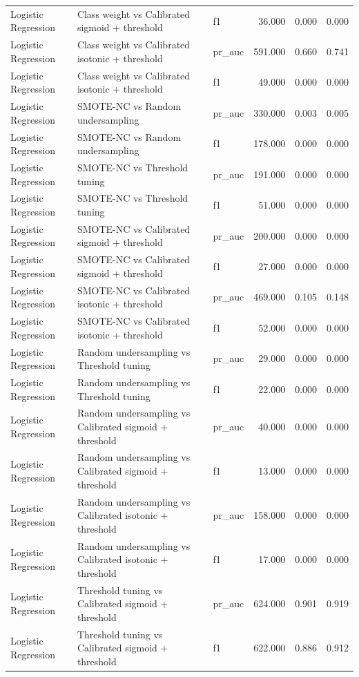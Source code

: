 \begin{tabular}{lllrrr}
Logistic Regression & Class weight vs Calibrated sigmoid + threshold & f1 & 36.000 & 0.000 & 0.000 \\
Logistic Regression & Class weight vs Calibrated isotonic + threshold & pr_auc & 591.000 & 0.660 & 0.741 \\
Logistic Regression & Class weight vs Calibrated isotonic + threshold & f1 & 49.000 & 0.000 & 0.000 \\
Logistic Regression & SMOTE-NC vs Random undersampling & pr_auc & 330.000 & 0.003 & 0.005 \\
Logistic Regression & SMOTE-NC vs Random undersampling & f1 & 178.000 & 0.000 & 0.000 \\
Logistic Regression & SMOTE-NC vs Threshold tuning & pr_auc & 191.000 & 0.000 & 0.000 \\
Logistic Regression & SMOTE-NC vs Threshold tuning & f1 & 51.000 & 0.000 & 0.000 \\
Logistic Regression & SMOTE-NC vs Calibrated sigmoid + threshold & pr_auc & 200.000 & 0.000 & 0.000 \\
Logistic Regression & SMOTE-NC vs Calibrated sigmoid + threshold & f1 & 27.000 & 0.000 & 0.000 \\
Logistic Regression & SMOTE-NC vs Calibrated isotonic + threshold & pr_auc & 469.000 & 0.105 & 0.148 \\
Logistic Regression & SMOTE-NC vs Calibrated isotonic + threshold & f1 & 52.000 & 0.000 & 0.000 \\
Logistic Regression & Random undersampling vs Threshold tuning & pr_auc & 29.000 & 0.000 & 0.000 \\
Logistic Regression & Random undersampling vs Threshold tuning & f1 & 22.000 & 0.000 & 0.000 \\
Logistic Regression & Random undersampling vs Calibrated sigmoid + threshold & pr_auc & 40.000 & 0.000 & 0.000 \\
Logistic Regression & Random undersampling vs Calibrated sigmoid + threshold & f1 & 13.000 & 0.000 & 0.000 \\
Logistic Regression & Random undersampling vs Calibrated isotonic + threshold & pr_auc & 158.000 & 0.000 & 0.000 \\
Logistic Regression & Random undersampling vs Calibrated isotonic + threshold & f1 & 17.000 & 0.000 & 0.000 \\
Logistic Regression & Threshold tuning vs Calibrated sigmoid + threshold & pr_auc & 624.000 & 0.901 & 0.919 \\
Logistic Regression & Threshold tuning vs Calibrated sigmoid + threshold & f1 & 622.000 & 0.886 & 0.912 \\

\end{tabular}
